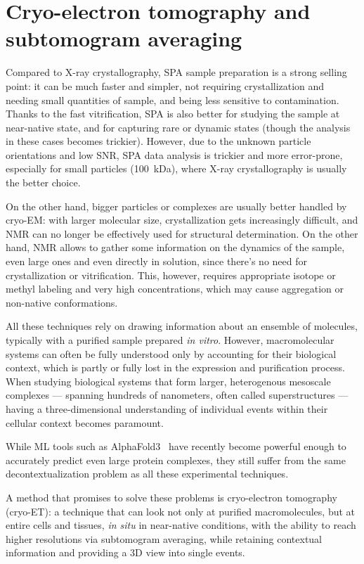 \chapter[Cryo-ET and STA]{Cryo-electron tomography and subtomogram averaging}\label{et}

Compared to X-ray crystallography, SPA sample preparation is a strong selling point: it can be much faster and simpler, not requiring crystallization and needing small quantities of sample, and being less sensitive to contamination.
Thanks to the fast vitrification, SPA is also better for studying the sample at near-native state, and for capturing rare or dynamic states (though the analysis in these cases becomes trickier).
However, due to the unknown particle orientations and low SNR, SPA data analysis is trickier and more error-prone, especially for small particles (\lesssim\qty{100}{\kilo\dalton}), where X-ray crystallography is usually the better choice.

On the other hand, bigger particles or complexes are usually better handled by cryo-EM: with larger molecular size, crystallization gets increasingly difficult, and NMR can no longer be effectively used for structural determination.
On the other hand, NMR allows to gather some information on the dynamics of the sample, even large ones and even directly in solution, since there's no need for crystallization or vitrification.
This, however, requires appropriate isotope or methyl labeling and very high concentrations, which may cause aggregation or non-native conformations.

All these techniques rely on drawing information about an ensemble of molecules, typically with a purified sample prepared \textit{in vitro}.
However, macromolecular systems can often be fully understood only by accounting for their biological context, which is partly or fully lost in the expression and purification process.
When studying biological systems that form larger, heterogenous mesoscale complexes --- spanning hundreds of nanometers, often called superstructures --- having a three-dimensional understanding of individual events within their cellular context becomes paramount.

While ML tools such as AlphaFold3~\cite{abramsonAccurateStructurePrediction2024} have recently become powerful enough to accurately predict even large protein complexes, they still suffer from the same decontextualization problem as all these experimental techniques.

A method that promises to solve these problems is cryo-electron tomography (cryo-ET): a technique that can look not only at purified macromolecules, but at entire cells and tissues, \textit{in situ} in near-native conditions, with the ability to reach higher resolutions via subtomogram averaging, while retaining contextual information and providing a 3D view into single events.

